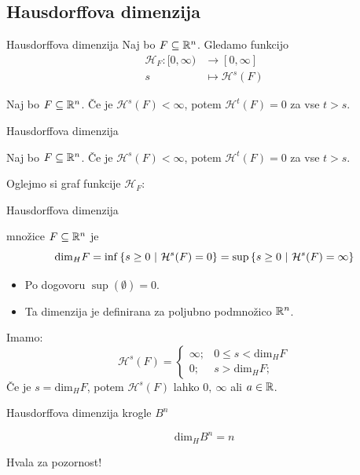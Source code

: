 \documentclass[10pt]{beamer}
\begin{document}
\subsection{Hausdorffova dimenzija}
\begin{frame}[t]{Hausdorffova dimenzija}
    Naj bo \(F \subseteq \mathbb{R}^n\). Gledamo funkcijo 
    \begin{align*}
        \mathcal{H}_F: [0, \infty) &\longrightarrow [0, \infty] \\
        s &\longmapsto \mathcal{H}^{s}(F)
    \end{align*}

    \begin{lema}
        Naj bo \(F \subseteq \mathbb{R}^n\). Če je \(\mathcal{H}^{s}(F) < \infty\), potem \(\mathcal{H}^{t}(F) = 0\) za vse \(t > s\).
    \end{lema}
\end{frame}

\begin{frame}[t]{Hausdorffova dimenzija}
    \begin{lema}
        Naj bo \(F \subseteq \mathbb{R}^n\). Če je \(\mathcal{H}^{s}(F) < \infty\), potem \(\mathcal{H}^{t}(F) = 0\) za vse \(t > s\).
    \end{lema}

    Oglejmo si graf funkcije \(\mathcal{H}_F\):
    \begin{center}
        \scalebox{0.8}{
            \drawGraf
        }        
    \end{center}    
\end{frame}

\begin{frame}[t]{Hausdorffova dimenzija}
    \begin{definicija}
         množice \(F \subseteq \mathbb{R}^n\) je 
        \[\text{dim}_H F = \inf \left\{s \geq 0 \ | \ \mathcal{H}^{s}(F) = 0\right\} = \sup \left\{s \geq 0 \ | \ \mathcal{H}^{s}(F) = \infty\right\}\]
    \end{definicija} 

    \pause
     {
        \begin{opomba}
            \begin{itemize}
                \item Po dogovoru \(\sup (\emptyset) = 0\).
                \item Ta dimenzija je definirana za poljubno podmnožico \(\mathbb{R}^n\).
            \end{itemize}   
        \end{opomba}
    }
    \pause 
    Imamo:
    \[
        \mathcal{H}^{s}(F) = \begin{cases}
            \infty; &0 \leq s < \text{dim}_H F \\ 
            0; &s > \text{dim}_H F;
        \end{cases}
    \]
    Če je \(s = \text{dim}_H F\), potem \(\mathcal{H}^{s}(F)\) lahko \(0, \  \infty\) ali \(a \in \mathbb{R}\).    
\end{frame}

\begin{frame}[t]{Hausdorffova dimenzija krogle \(B^n\)}
    \begin{lema}
        \[\text{dim}_H B^n = n\]
    \end{lema}
\end{frame}

\begin{frame}
  \centering
  \Huge Hvala za pozornost!
\end{frame}
\end{document}
